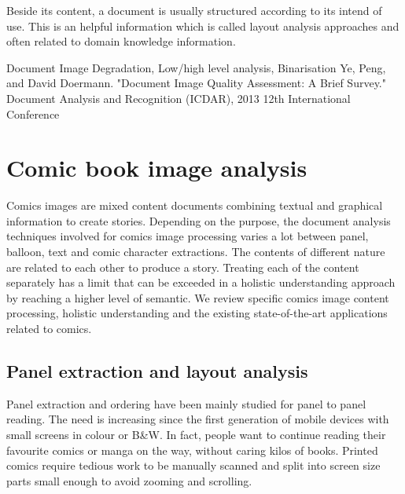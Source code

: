 Beside its content, a document is usually structured according to its intend of use.
This is an helpful information which is called layout analysis approaches and often related to domain knowledge information.



Document Image Degradation, Low/high level analysis, Binarisation
Ye, Peng, and David Doermann. "Document Image Quality
Assessment: A Brief Survey." Document Analysis and
Recognition (ICDAR), 2013 12th International Conference




\section{Comic book image analysis} %
\label{sec:comic_book_image}


Comics images are mixed content documents combining textual and graphical information to create stories.
Depending on the purpose, the document analysis techniques involved for comics image processing varies a lot between panel, balloon, text and comic character extractions.
The contents of different nature are related to each other to produce a story.
Treating each of the content separately has a limit that can be exceeded in a holistic understanding approach by reaching a higher level of semantic.
We review specific comics image content processing, holistic understanding and the existing state-of-the-art applications related to comics.%



\subsection{Panel extraction and layout analysis}
\label{sec:sota:layout_panel}


Panel extraction and ordering have been mainly studied for panel to panel reading.
The need is increasing since the first generation of mobile devices with small screens in colour or B\&W.
In fact, people want to continue reading their favourite comics or manga on the way, without caring kilos of books.
Printed comics require tedious work to be manually scanned and split into screen size parts small enough to avoid zooming and scrolling.

